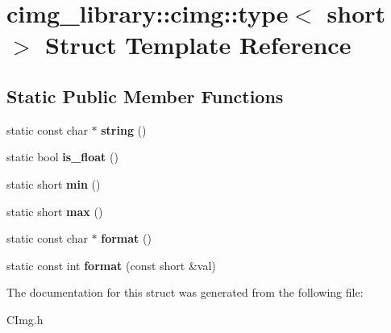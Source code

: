 \hypertarget{structcimg__library_1_1cimg_1_1type_3_01short_01_4}{\section{cimg\-\_\-library\-:\-:cimg\-:\-:type$<$ short $>$ Struct Template Reference}
\label{structcimg__library_1_1cimg_1_1type_3_01short_01_4}
}
\subsection*{Static Public Member Functions}
\begin{DoxyCompactItemize}
\item 
\hypertarget{structcimg__library_1_1cimg_1_1type_3_01short_01_4_aa20228bc8155a9b6b196c8d089f0875e}{static const char $\ast$ {\bfseries string} ()}\label{structcimg__library_1_1cimg_1_1type_3_01short_01_4_aa20228bc8155a9b6b196c8d089f0875e}

\item 
\hypertarget{structcimg__library_1_1cimg_1_1type_3_01short_01_4_a4e7b2132b699c741e24002f2cf0646d1}{static bool {\bfseries is\-\_\-float} ()}\label{structcimg__library_1_1cimg_1_1type_3_01short_01_4_a4e7b2132b699c741e24002f2cf0646d1}

\item 
\hypertarget{structcimg__library_1_1cimg_1_1type_3_01short_01_4_ad178d7c70c2e58cd4ed8f72278b71d75}{static short {\bfseries min} ()}\label{structcimg__library_1_1cimg_1_1type_3_01short_01_4_ad178d7c70c2e58cd4ed8f72278b71d75}

\item 
\hypertarget{structcimg__library_1_1cimg_1_1type_3_01short_01_4_abaebbd85de3efd01551f44bef24af2c0}{static short {\bfseries max} ()}\label{structcimg__library_1_1cimg_1_1type_3_01short_01_4_abaebbd85de3efd01551f44bef24af2c0}

\item 
\hypertarget{structcimg__library_1_1cimg_1_1type_3_01short_01_4_a0567adc75a4f1208de596817c1103863}{static const char $\ast$ {\bfseries format} ()}\label{structcimg__library_1_1cimg_1_1type_3_01short_01_4_a0567adc75a4f1208de596817c1103863}

\item 
\hypertarget{structcimg__library_1_1cimg_1_1type_3_01short_01_4_a374cb8d9e6bd2a2cb8d6b30cf5f3aced}{static const int {\bfseries format} (const short \&val)}\label{structcimg__library_1_1cimg_1_1type_3_01short_01_4_a374cb8d9e6bd2a2cb8d6b30cf5f3aced}

\end{DoxyCompactItemize}


The documentation for this struct was generated from the following file\-:\begin{DoxyCompactItemize}
\item 
C\-Img.\-h\end{DoxyCompactItemize}
